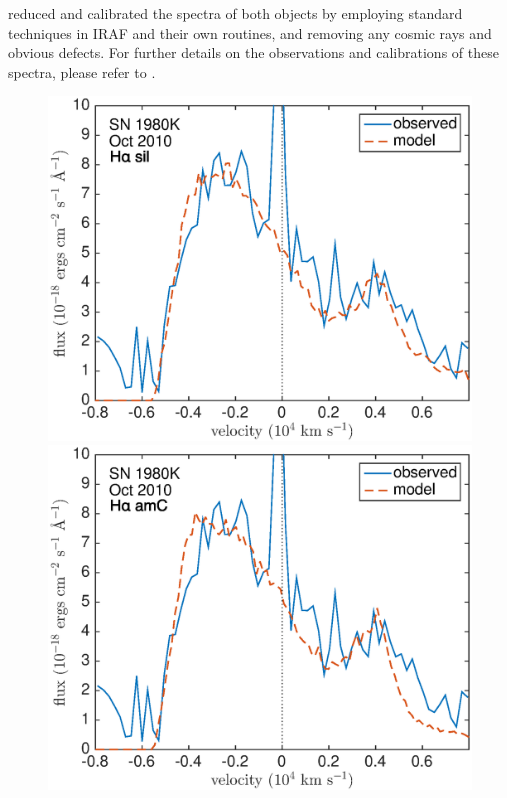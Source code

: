 \citet{Milisavljevic2012} reduced and calibrated the spectra of both objects by employing
standard techniques in IRAF and their own routines, and removing any cosmic rays and obvious defects. For further details on the observations and calibrations of these spectra, please refer to \citet{Milisavljevic2012}. 

\begin{figure}[!t]
\centering
\includegraphics[scale=0.4,clip=true, trim=20 0 40 20]{chapters/chapter6/figs/80K/smooth/Ha}
\includegraphics[scale=0.4,clip=true, trim=20 0 40 20]{chapters/chapter6/figs/80K/smooth/Ha_amC}


\end{figure}
